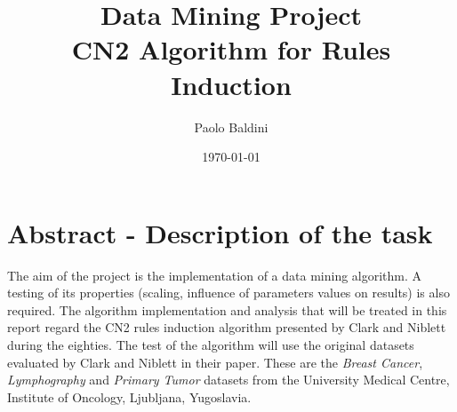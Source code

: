 \documentclass{article}
\title{Data Mining Project\\CN2 Algorithm for Rules Induction}
\author{Paolo Baldini}
\date{\today}
\begin{document}
\maketitle
\newpage


\section*{Abstract - Description of the task}
The aim of the project is the implementation of a data mining algorithm. A testing of its properties (scaling, influence of parameters values on results) is also required.
\vspace{12pt}\newline
The algorithm implementation and analysis that will be treated in this report regard the CN2 rules induction algorithm presented by Clark and Niblett during the eighties.
\vspace{12pt}\newline
The test of the algorithm will use the original datasets evaluated by Clark and Niblett in their paper. These are the \textit{Breast Cancer}, \textit{Lymphography} and \textit{Primary Tumor} datasets from the University Medical Centre, Institute of Oncology, Ljubljana, Yugoslavia.
\newpage

\tableofcontents
\newpage

\end{document}
